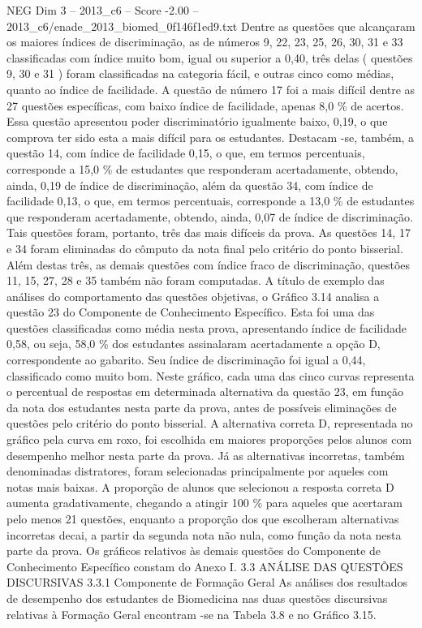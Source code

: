 \begin{textsample}{NEG Dim 3 – 2013\_c6 – Score -2.00 – 2013\_c6/enade\_2013\_biomed\_0f146f1ed9.txt}
Dentre as questões que alcançaram os maiores índices de discriminação, as de números 9, 22, 23, 25, 26, 30, 31 e 33 classificadas com índice muito bom, igual ou superior a 0,40, três delas ( questões 9, 30 e 31 ) foram classificadas na categoria fácil, e outras cinco como médias, quanto ao índice de facilidade.
A questão de número 17 foi a mais difícil dentre as 27 questões específicas, com baixo índice de facilidade, apenas 8,0 \% de acertos.
Essa questão apresentou poder discriminatório igualmente baixo, 0,19, o que comprova ter sido esta a mais difícil para os estudantes.
Destacam -se, também, a questão 14, com índice de facilidade 0,15, o que, em termos percentuais, corresponde a 15,0 \% de estudantes que responderam acertadamente, obtendo, ainda, 0,19 de índice de discriminação, além da questão 34, com índice de facilidade 0,13, o que, em termos percentuais, corresponde a 13,0 \% de estudantes que responderam acertadamente, obtendo, ainda, 0,07 de índice de discriminação.
Tais questões foram, portanto, três das mais difíceis da prova.
As questões 14, 17 e 34 foram eliminadas do cômputo da nota final pelo critério do ponto bisserial.
Além destas três, as demais questões com índice fraco de discriminação, questões 11, 15, 27, 28 e 35 também não foram computadas.
A título de exemplo das análises do comportamento das questões objetivas, o Gráfico 3.14 analisa a questão 23 do Componente de Conhecimento Específico.
Esta foi uma das questões classificadas como média nesta prova, apresentando índice de facilidade 0,58, ou seja, 58,0 \% dos estudantes assinalaram acertadamente a opção D, correspondente ao gabarito.
Seu índice de discriminação foi igual a 0,44, classificado como muito bom.
Neste gráfico, cada uma das cinco curvas representa o percentual de respostas em determinada alternativa da questão 23, em função da nota dos estudantes nesta parte da prova, antes de possíveis eliminações de questões pelo critério do ponto bisserial.
A alternativa correta D, representada no gráfico pela curva em roxo, foi escolhida em maiores proporções pelos alunos com desempenho melhor nesta parte da prova.
Já as alternativas incorretas, também denominadas distratores, foram selecionadas principalmente por aqueles com notas mais baixas.
A proporção de alunos que selecionou a resposta correta D aumenta gradativamente, chegando a atingir 100 \% para aqueles que acertaram pelo menos 21 questões, enquanto a proporção dos que escolheram alternativas incorretas decai, a partir da segunda nota não nula, como função da nota nesta parte da prova.
Os gráficos relativos às demais questões do Componente de Conhecimento Específico constam do Anexo I. 3.3 ANÁLISE DAS QUESTÕES DISCURSIVAS 3.3.1 Componente de Formação Geral As análises dos resultados de desempenho dos estudantes de Biomedicina nas duas questões discursivas relativas à Formação Geral encontram -se na Tabela 3.8 e no Gráfico 3.15.

\end{textsample}
